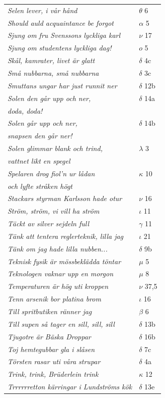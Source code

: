 \documentclass[a6paper,10pt]{article}
\begin{document}
\newpage
\begin{table}[!h]
\begin{tabular}{l l}
\textit{Selen lever, i vår hånd}	&$\theta$ 6\\
\textit{Should auld acquaintance be forgot}	&$\alpha$ 5\\
\textit{Sjung om fru Svenssons lyckliga karl}	&$\nu$ 17\\
\textit{Sjung om studentens lyckliga dag!}	&$o$ 5\\
\textit{Skål, kamrater, livet är glatt}	&$\delta$ 4c\\
\textit{Små nubbarna, små nubbarna}	&$\delta$ 3c\\
\textit{Smuttans ungar har just runnit ner}	&$\delta$ 12b\\
\textit{Solen den går upp och ner,}	&$\delta$ 14a\\
\textit{doda, doda!} &\\
\textit{Solen går upp och ner,}	&$\delta$ 14b\\
\textit{snapsen den går ner!} &\\
\textit{Solen glimmar blank och trind,}	&$\lambda$ 3\\
\textit{vattnet likt en spegel} &\\
\textit{Spelaren drog fiol'n ur lådan}	&$\kappa$ 10\\
\textit{och lyfte stråken högt} &\\
\textit{Stackars styrman Karlsson hade otur}	&$\nu$ 16\\
\textit{Ström, ström, vi vill ha ström}	&$\iota$ 11\\
\textit{Täckt av silver sejdeln full}	&$\gamma$ 11\\
\textit{Tänk att tentera reglerteknik, lilla jag}&$\iota$ 21\\
\textit{Tänk om jag hade lilla nubben...}	&$\delta$ 9b\\
\textit{Teknisk fysik är mössbeklädda töntar}	&$\mu$ 5\\
\textit{Teknologen vaknar upp en morgon}    &$\mu$ 8\\
\textit{Temperaturen är hög uti kroppen}	&$\nu$ 37,5\\
\textit{Tenn arsenik bor platina brom}	&$\iota$ 16\\
\textit{Till spritbutiken ränner jag}	&$\beta$ 6\\
\textit{Till supen så tager en sill, sill, sill}	&$\delta$ 13b\\
\textit{Tjugotre är Bäska Droppar}	&$\delta$ 16b\\
\textit{Toj hemtegubbar gla i slåsen}	&$\delta$ 7c\\
\textit{Törsten rasar uti våra strupar}	&$\delta$ 4a\\
\textit{Trink, trink, Brüderlein trink}	&$\kappa$ 12\\
\textit{Trrrrrretton kärringar i Lundströms kök}	&$\delta$ 13e\\
\end{tabular}
\end{table}
\end{document}
